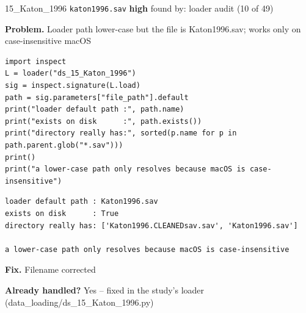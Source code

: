 \documentclass[9pt, t, handout]{beamer}
\newcommand{\ans}[1]{\textcolor{structure.fg}{#1}}
\begin{document}
\begin{frame}[fragile]{15\_Katon\_1996 \quad \texttt{katon1996.sav}}
  {\scriptsize\textcolor{orange!80!black}{\textbf{high}} \quad
   found by: loader audit \quad (10 of 49)}
  \vspace{3pt}

  {\footnotesize \textbf{Problem.} Loader path lower-case but the file is Katon1996.sav; works only on case-insensitive macOS}
  \vspace{4pt}

  \begin{Verbatim}[fontsize=\tiny, frame=single, framesep=2pt, label=\tiny reproduce]
import inspect
L = loader("ds_15_Katon_1996")
sig = inspect.signature(L.load)
path = sig.parameters["file_path"].default
print("loader default path :", path.name)
print("exists on disk      :", path.exists())
print("directory really has:", sorted(p.name for p in path.parent.glob("*.sav")))
print()
print("a lower-case path only resolves because macOS is case-insensitive")
  \end{Verbatim}
  \begin{Verbatim}[fontsize=\tiny, frame=single, framesep=2pt, label=\tiny output]
loader default path : Katon1996.sav
exists on disk      : True
directory really has: ['Katon1996.CLEANEDsav.sav', 'Katon1996.sav']

a lower-case path only resolves because macOS is case-insensitive
  \end{Verbatim}
  \vspace{2pt}

  {\footnotesize \textbf{Fix.} Filename corrected}
  \vspace{2pt}

  {\footnotesize \textbf{Already handled?} \ans{Yes} -- fixed in the study's loader
   (data\_loading/ds\_15\_Katon\_1996.py)}
\end{frame}
\end{document}
